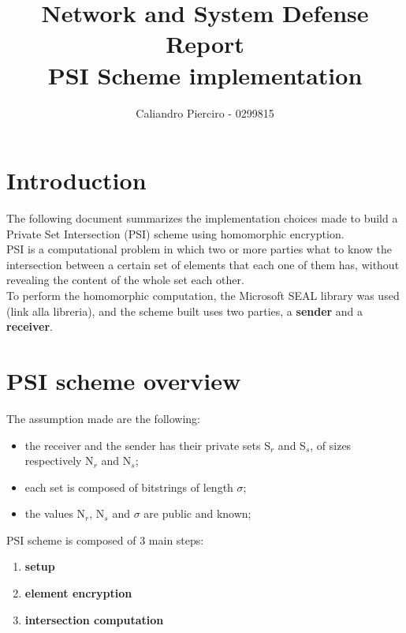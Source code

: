 \documentclass[12pt]{extarticle}
\title{Network and System Defense Report\\PSI Scheme implementation}
\author{Caliandro Pierciro - 0299815}
\begin{document}
\maketitle
\tableofcontents
\newpage

\section{Introduction}
The following document summarizes the implementation choices made to build a Private Set Intersection (PSI) scheme using homomorphic encryption.\\
PSI is a computational problem in which two or more parties what to know the intersection between a certain set of elements that each one of them has, without revealing the content of the whole set each other.\\
To perform the homomorphic computation, the Microsoft SEAL library was used (link alla libreria), and the scheme built uses two parties, a \textbf{sender} and a \textbf{receiver}.
\section{PSI scheme overview}
The assumption made are the following:
\begin{itemize}
	\item the receiver and the sender has their private sets S$_r$ and S$_s$, of sizes respectively N$_r$ and N$_s$;
	\item each set is composed of bitstrings of length $\sigma$;
	\item the values N$_r$, N$_s$ and $\sigma$ are public and known;
\end{itemize}
PSI scheme is composed of 3 main steps:
\begin{enumerate}
	\item \textbf{setup}
	\item \textbf{element encryption}
	\item \textbf{intersection computation}
\end{enumerate}
\end{document}
